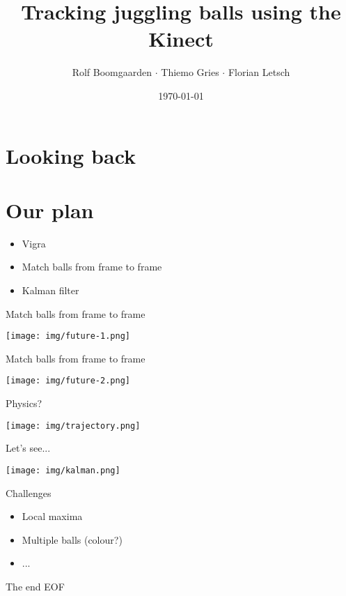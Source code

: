 \documentclass{beamer}
\title{Tracking juggling balls using the Kinect}
\author[Rolf $\cdot$ Thiemo $\cdot$ Flo]{Rolf Boomgaarden $\cdot$ Thiemo Gries $\cdot$ Florian Letsch}
\institute{Universität Hamburg}
\date{\today}
\begin{document}
\frame
{
\titlepage
}
\section{Looking back}

\section{Our plan}

\begin{frame}{}
\begin{itemize}
\item Vigra
\item Match balls from frame to frame
\item Kalman filter
\end{itemize}
\end{frame}

\begin{frame}{Match balls from frame to frame}

\texttt{[image: img/future-1.png]}

\end{frame}

\begin{frame}{Match balls from frame to frame}

\texttt{[image: img/future-2.png]}

\end{frame}


\begin{frame}{Physics?}

\texttt{[image: img/trajectory.png]}

\end{frame}

\begin{frame}{Let's see...}

\texttt{[image: img/kalman.png]}

\end{frame}



\begin{frame}{Challenges}
\begin{itemize}
	\item Local maxima
	\item Multiple balls (colour?)
	\item ...
\end{itemize}
\end{frame}

\begin{frame}{The end}
EOF
\end{frame}
\end{document}
